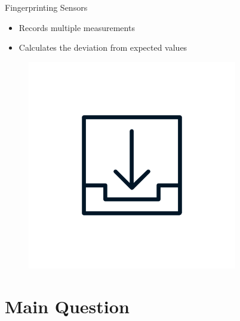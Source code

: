 \documentclass[aspectratio=169]{beamer}
[aspectratio=169] %
\begin{document}
\begin{frame}{Fingerprinting Sensors}
  \begin{minipage}{0.49\textwidth} 
    \begin{itemize}
      \item Records multiple measurements
      \item Calculates the deviation from expected values
    \end{itemize}
  \end{minipage}
  \hfill
  \begin{minipage}{0.49\textwidth} 
    \begin{figure}
      \centering
      \includegraphics[height=0.5\textheight]{figures/download.png}
    \end{figure}
  \end{minipage}
\end{frame}

\section{Main Question}
\end{document}
